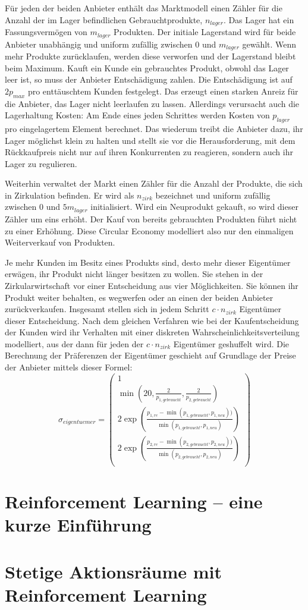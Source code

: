 Für jeden der beiden Anbieter enthält das Marktmodell einen Zähler für die Anzahl der im Lager befindlichen Gebrauchtprodukte, $n_{lager}$.
Das Lager hat ein Fassungsvermögen von $m_{lager}$ Produkten.
Der initiale Lagerstand wird für beide Anbieter unabhängig und uniform zufällig zwischen $0$ und $m_{lager}$ gewählt.
Wenn mehr Produkte zurücklaufen, werden diese verworfen und der Lagerstand bleibt beim Maximum.
Kauft ein Kunde ein gebrauchtes Produkt, obwohl das Lager leer ist, so muss der Anbieter Entschädigung zahlen.
Die Entschädigung ist auf $2 p_{max}$ pro enttäuschtem Kunden festgelegt.
Das erzeugt einen starken Anreiz für die Anbieter, das Lager nicht leerlaufen zu lassen.
Allerdings verursacht auch die Lagerhaltung Kosten: Am Ende eines jeden Schrittes werden Kosten von $p_{lager}$ pro eingelagertem Element berechnet.
Das wiederum treibt die Anbieter dazu, ihr Lager möglichst klein zu halten und stellt sie vor die Herausforderung, mit dem Rückkaufpreis nicht nur auf ihren Konkurrenten zu reagieren, sondern auch ihr Lager zu regulieren.

Weiterhin verwaltet der Markt einen Zähler für die Anzahl der Produkte, die sich in Zirkulation befinden.
Er wird als $n_{zirk}$ bezeichnet und uniform zufällig zwischen $0$ und $5 m_{lager}$ initialisiert.
Wird ein Neuprodukt gekauft, so wird dieser Zähler um eins erhöht.
Der Kauf von bereits gebrauchten Produkten führt nicht zu einer Erhöhung.
Diese Circular Economy modelliert also nur den einmaligen Weiterverkauf von Produkten.

Je mehr Kunden im Besitz eines Produkts sind, desto mehr dieser Eigentümer erwägen, ihr Produkt nicht länger besitzen zu wollen.
Sie stehen in der Zirkularwirtschaft vor einer Entscheidung aus vier Möglichkeiten.
Sie können ihr Produkt weiter behalten, es wegwerfen oder an einen der beiden Anbieter zurückverkaufen.
Insgesamt stellen sich in jedem Schritt $c \cdot n_{zirk}$ Eigentümer dieser Entscheidung.
Nach dem gleichen Verfahren wie bei der Kaufentscheidung der Kunden wird ihr Verhalten mit einer diskreten Wahrscheinlichkeitsverteilung modelliert, aus der dann für jeden der $c \cdot n_{zirk}$ Eigentümer geshuffelt wird.
Die Berechnung der Präferenzen der Eigentümer geschieht auf Grundlage der Preise der Anbieter mittels dieser Formel:
\begin{equation}
    \sigma_{eigentuemer}=
    \begin{pmatrix}
        1\\
        \min \left(20, \frac{2}{p_{1, gebraucht}},  \frac{2}{p_{2, gebraucht}}\right)\\
        2 \exp{\left(\frac{p_{1, re} - \min{(p_{1, gebraucht}, p_{1, neu})})}{\min{(p_{1, gebraucht}, p_{1, neu})}}\right)}\\
        2 \exp{\left(\frac{p_{2, re} - \min{(p_{2, gebraucht}, p_{2, neu})})}{\min{(p_{2, gebraucht}, p_{2, neu})}}\right)}\\
    \end{pmatrix}
\end{equation}

\section{Reinforcement Learning -- eine kurze Einführung}

\section{Stetige Aktionsräume mit Reinforcement Learning}
